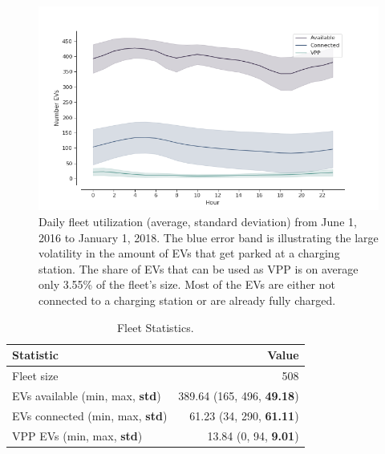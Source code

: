\documentclass[a4paper, 12pt]{article}
\begin{document}
\begin{figure}[h]
\centering
\includegraphics[width=1\linewidth]{fig/fleet-utilization.png}
\caption[Fleet Utilzation]{Daily fleet utilization (average, standard deviation) from June 1, 2016 to January 1, 2018. The blue error band is illustrating the large volatility in the amount of EVs that get parked at a charging station. The share of EVs that can be used as VPP is on average only 3.55\% of the fleet's size. Most of the EVs are either not connected to a charging station or are already fully charged. \label{fig-fleet-utilization}}
\end{figure}

\begin{table}[hp]
\caption[Fleet Statistics]{Fleet Statistics. \label{table-sim-stats}}
\centering
\begin{tabular}{lr}
\hline
\hline
Statistic & Value\\
\hline
Fleet size & 508\\
EVs available (min, max, \textbf{std}) & 389.64 (165, 496, \textbf{49.18})\\
EVs connected (min, max, \textbf{std}) & 61.23 (34, 290, \textbf{61.11})\\
VPP EVs (min, max, \textbf{std}) & 13.84 (0, 94, \textbf{9.01})\\
\hline
\hline
\end{tabular}
\end{table}
\end{document}

